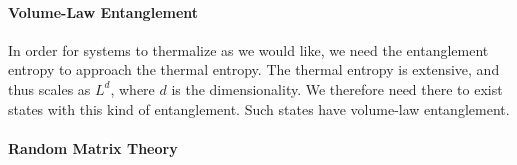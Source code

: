 \paragraph{Volume-Law Entanglement}
In order for systems to thermalize as we would like, we need the entanglement entropy to approach the thermal entropy. The thermal entropy is extensive, and thus scales as $L^{d}$, where $d$ is the dimensionality. We therefore need there to exist states with this kind of entanglement. Such states have volume-law entanglement.

\paragraph{Random Matrix Theory}